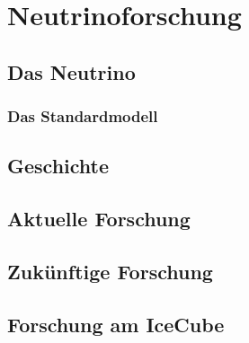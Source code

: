 \chapter{Neutrinoforschung} 
    \vspace{8pt}
    \section{Das Neutrino}
    \subsection{Das Standardmodell}    
    \section{Geschichte} 
    \section{Aktuelle Forschung}
    \section{Zukünftige Forschung}
    \section{Forschung am IceCube}